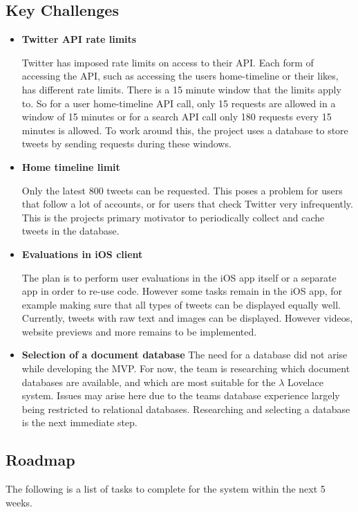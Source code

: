 \documentclass{article}
\begin{document}
\subsection{Key Challenges}
\begin{itemize}
    \item \textbf{Twitter API rate limits}
    
    Twitter has imposed rate limits on access to their API. Each form of accessing the API, such as accessing the users home-timeline or their likes, has different rate limits. There is a 15 minute window that the limits apply to. So for a user home-timeline API call, only 15 requests are allowed in a window of 15 minutes or for a search API call only 180 requests every 15 minutes is allowed. To work around this, the project uses a database to store tweets by sending requests during these windows.
    
    \item \textbf{Home timeline limit}
    
    Only the latest 800 tweets can be requested. This poses a problem for users that follow a lot of accounts, or for users that check Twitter very infrequently. This is the projects primary motivator to periodically collect and cache tweets in the database.
    
    \item \textbf{Evaluations in iOS client}
    
    The plan is to perform user evaluations in the iOS app itself or a separate app in order to re-use code. However some tasks remain in the iOS app, for example making sure that all types of tweets can be displayed equally well. Currently, tweets with raw text and images can be displayed. However videos, website previews and more remains to be implemented.
    
    \item \textbf{Selection of a document database}
    The need for a database did not arise while developing the MVP. For now, the team is researching which document databases are available, and which are most suitable for the $\lambda$ Lovelace system. Issues may arise here due to the teams database experience largely being restricted to relational databases. Researching and selecting a database is the next immediate step.
    
\end{itemize}


\subsection{Roadmap}
The following is a list of tasks to complete for the system within the next 5 weeks.
\end{document}
